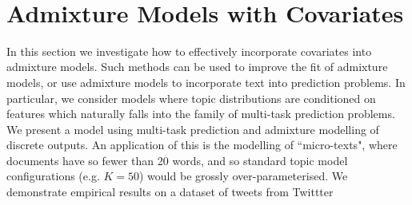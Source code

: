 %
%
%


\
\chapter{Admixture Models with Covariates}
In this section we investigate how to effectively incorporate covariates into admixture models. Such methods can be used to improve the fit of admixture models, or use admixture models to incorporate text into prediction problems. In particular, we consider models where topic distributions are conditioned on features which naturally falls into the family of multi-task prediction problems. We present a model using multi-task prediction and admixture modelling of discrete outputs. An application of this is the modelling of ``micro-texts", where documents have so fewer than 20 words, and so standard topic model configurations (e.g. $K=50$) would be grossly over-parameterised. We demonstrate empirical results on a dataset of tweets from Twittter

